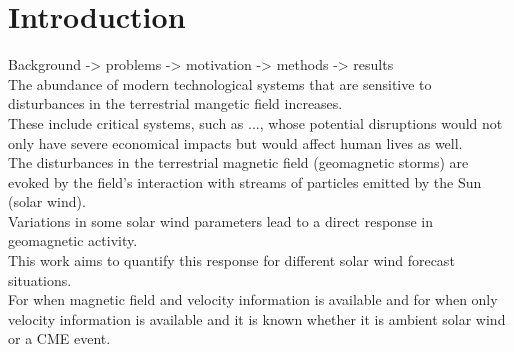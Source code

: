 
\chapter{Introduction}
\label{chap:introduction}

Background -> problems -> motivation -> methods -> results\\



The abundance of modern technological systems that are sensitive to disturbances in the terrestrial mangetic field increases.\\
These include critical systems, such as ..., whose potential disruptions would not only have severe economical impacts but would affect human lives as well.\\
The disturbances in the terrestrial magnetic field (geomagnetic storms) are evoked by the field's interaction with streams of particles emitted by the Sun (solar wind).\\
Variations in some solar wind parameters lead to a direct response in geomagnetic activity.\\
This work aims to quantify this response for different solar wind forecast situations.\\
For when magnetic field and velocity information is available and for when only velocity information is available and it is known whether it is ambient solar wind or a CME event.\\

